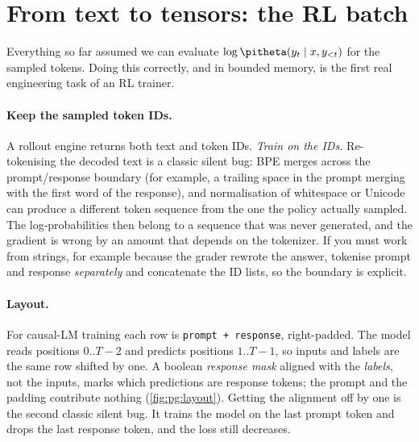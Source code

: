 \section{From text to tensors: the RL batch}\label{sec:pg:batch}

Everything so far assumed we can evaluate $\log\pitheta(y_t\mid x,y_{<t})$ for the sampled
tokens. Doing this correctly, and in bounded memory, is the first real engineering task of an
RL trainer.

\paragraph{Keep the sampled token IDs.} A rollout engine returns both text and token IDs.
\emph{Train on the IDs.} Re-tokenising the decoded text is a classic silent bug: BPE merges
across the prompt/response boundary (for example, a trailing space in the prompt merging with
the first word of the response), and normalisation of whitespace or Unicode can produce a
different token sequence from the one the policy actually sampled. The log-probabilities then
belong to a sequence that was never generated, and the gradient is wrong by an amount that
depends on the tokenizer. If you must work from strings, for example because the grader
rewrote the answer, tokenise prompt and response \emph{separately} and concatenate the ID
lists, so the boundary is explicit.

\paragraph{Layout.} For causal-LM training each row is \texttt{prompt + response}, right-padded.
The model reads positions $0..T-2$ and predicts positions $1..T-1$, so inputs and labels
are the same row shifted by one. A boolean \emph{response mask} aligned with the
\emph{labels}, not the inputs, marks which predictions are response tokens; the prompt and
the padding contribute nothing (\cref{fig:pg:layout}). Getting the alignment off by one is the
second classic silent bug. It trains the model on the last prompt token and drops the last
response token, and the loss still decreases.

